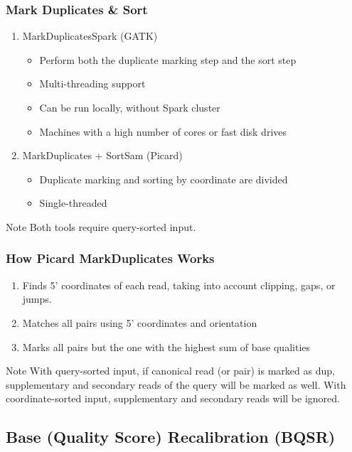 \documentclass{beamer}
\begin{document}
\begin{frame}
\frametitle{Mark Duplicates \& Sort}

\begin{enumerate}
\item MarkDuplicatesSpark (GATK)
\begin{itemize}
\item Perform both the duplicate marking step and the sort step
\item Multi-threading support
\item Can be run locally, without Spark cluster
\item Machines with a high number of cores or fast disk drives
\end{itemize}
\item MarkDuplicates + SortSam (Picard)
\begin{itemize}
\item Duplicate marking and sorting by coordinate are divided
\item Single-threaded
\end{itemize}
\end{enumerate}

\begin{block}{Note}
Both tools require query-sorted input. 
\end{block}

\end{frame}

\begin{frame}
\frametitle{How Picard MarkDuplicates Works}
\begin{enumerate}
\item Finds 5' coordinates of each read, taking into account clipping, gaps, or jumps.
\item Matches all pairs using 5' coordinates and orientation
\item Marks all pairs but the one with the highest sum of base qualities
\end{enumerate}

\begin{block}{Note}
With query-sorted input, if canonical read (or pair) is marked as dup, supplementary and secondary reads of the query will be marked as well.
With coordinate-sorted input, supplementary and secondary reads will be ignored.
\end{block}

\end{frame}

\subsection{Base (Quality Score) Recalibration (BQSR)}
\end{document}
